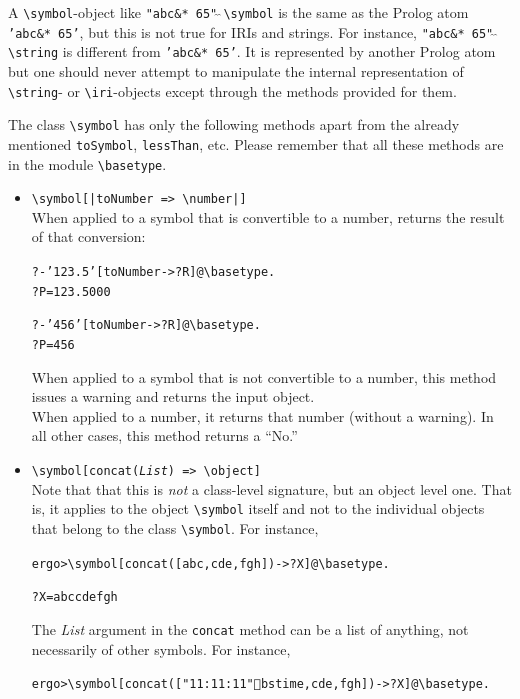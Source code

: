 \documentclass[11pt]{article}
\newcommand{\prompt}{ergo> }
\newcommand{\bs}{\textbackslash}
\begin{document}
A \texttt{\bs{}symbol}-object like
\texttt{"abc\&* 65"$\hat{~}\hat{~}$\bs{}symbol} is the same as the Prolog atom
\texttt{'abc\&* 65'}, but this is not true for IRIs and strings.
For instance, \texttt{"abc\&* 65"$\hat{~}\hat{~}$\bs{}string}
is different from \texttt{'abc\&* 65'}. It is represented by another Prolog
atom but one should never attempt to manipulate the internal representation
of \texttt{\bs{}string}- or \texttt{\bs{}iri}-objects except through the
methods provided for them.  


The class \texttt{\bs{}symbol} has only the following methods apart from the
already mentioned \texttt{toSymbol}, \texttt{lessThan}, etc.
Please remember that all these methods are in the module
\texttt{\bs{}basetype}. 
\begin{itemize}
\item  \texttt{\bs{}symbol[|toNumber => \bs{}number|]}
  \\
    When applied to a symbol that is convertible to a number, returns the
    result of that conversion:
    \begin{alltt}
        ?- '123.5'[toNumber->?R]@\bs{}basetype.
        ?P = 123.5000

        ?- '456'[toNumber->?R]@\bs{}basetype.
        ?P = 456
    \end{alltt}
    When applied to a symbol that is not convertible to a number, this method
    issues a warning and returns the input object.
    \\
    When applied to a number, it returns that number (without a warning). In
    all other cases, this method returns a ``No.''
\item  \texttt{\bs{}symbol[concat(\emph{List}) => \bs{}object]}
  \\
Note that that this is \emph{not} a class-level signature, but an
object level one. That is, it applies to the object \texttt{\bs{}symbol}
itself and not to the individual objects that belong to the class
\texttt{\bs{}symbol}.  
For instance,
\begin{alltt}
\prompt \bs{}symbol[concat([abc,cde,fgh])->?X]@\bs{}basetype.

?X = abccdefgh
\end{alltt}
The \emph{List} argument in the \texttt{concat} method can be a list of anything,
not necessarily of other symbols. For instance,
\begin{alltt}
\prompt \bs{}symbol[concat(["11:11:11"^^\bs{}time,cde,fgh])->?X]@\bs{}basetype.


\end{alltt}
\end{itemize}
\end{document}
